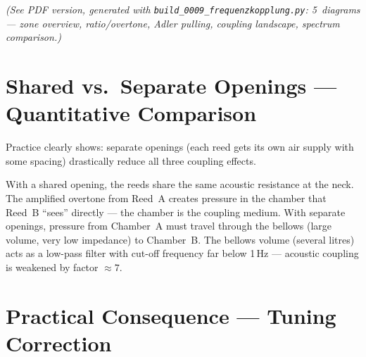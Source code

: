 \documentclass[11pt,a4paper]{article}
\begin{document}
\begin{flushleft}
\small\itshape(See PDF version, generated with \texttt{build\_0009\_frequenzkopplung.py}:
5~diagrams --- zone overview, ratio/overtone, Adler pulling, coupling landscape, spectrum comparison.)
\end{flushleft}

\section{Shared vs.\ Separate Openings --- Quantitative Comparison}

Practice clearly shows: separate openings (each reed gets its own air supply with some spacing) drastically reduce all three coupling effects.

With a shared opening, the reeds share the same acoustic resistance at the neck. The amplified overtone from Reed~A creates pressure in the chamber that Reed~B ``sees'' directly --- the chamber is the coupling medium. With separate openings, pressure from Chamber~A must travel through the bellows (large volume, very low impedance) to Chamber~B. The bellows volume (several litres) acts as a low-pass filter with cut-off frequency far below 1\,Hz --- acoustic coupling is weakened by factor $\approx 7$.

\begin{table}[H]
\centering\small
\caption{Empirical comparison values: shared vs.\ separate openings (full playing volume)}
\end{table}

\section{Practical Consequence --- Tuning Correction}
\end{document}
